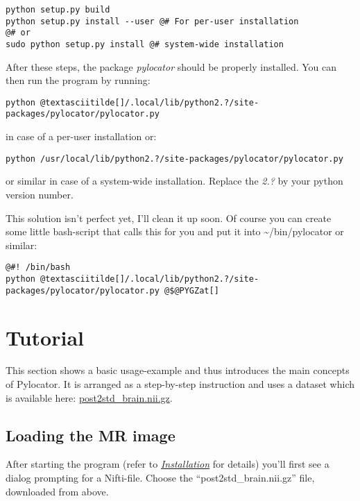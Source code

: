 \documentclass[letterpaper,10pt,english]{sphinxmanual}
\begin{document}
\begin{Verbatim}[commandchars=@\[\]]
python setup.py build
python setup.py install --user @# For per-user installation
@# or
sudo python setup.py install @# system-wide installation
\end{Verbatim}

After these steps, the package \emph{pylocator} should be properly installed. You can then run the program
by running:

\begin{Verbatim}[commandchars=@\[\]]
python @textasciitilde[]/.local/lib/python2.?/site-packages/pylocator/pylocator.py
\end{Verbatim}

in case of a per-user installation or:

\begin{Verbatim}[commandchars=@\[\]]
python /usr/local/lib/python2.?/site-packages/pylocator/pylocator.py
\end{Verbatim}

or similar in case of a system-wide installation. Replace the \emph{2.?} by your python version number.

This solution isn't perfect yet, I'll clean it up soon. Of course you can create some little bash-script
that calls this for you and put it into \textasciitilde{}/bin/pylocator or similar:

\begin{Verbatim}[commandchars=@\[\]]
@#! /bin/bash
python @textasciitilde[]/.local/lib/python2.?/site-packages/pylocator/pylocator.py @$@PYGZat[]
\end{Verbatim}


\section{Tutorial}
\label{tutorial::doc}\label{tutorial:tutorial}
This section shows a basic usage-example and thus introduces the main
concepts of Pylocator.  It is arranged as a step-by-step instruction and
uses a dataset which is available here:
\href{http://pylocator.thorstenkranz.de/download/post2std\_brain.nii.gz}{post2std\_brain.nii.gz}.


\subsection{Loading the MR image}
\label{tutorial:loading-the-mr-image}
After starting the program (refer to {\hyperref[install::doc]{\emph{Installation}}} for
details) you'll first see a dialog prompting for a Nifti-file. Choose the
``post2std\_brain.nii.gz'' file, downloaded from above.
\end{document}
